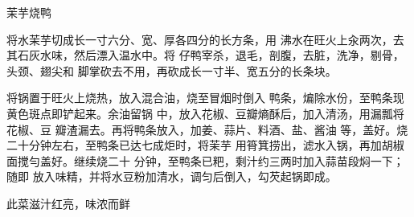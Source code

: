 \begin{recipe}{茉芋烧鸭}

\ingredients




\cooking

\step 将水茉芋切成长一寸六分、宽、厚各四分的长方条，用 沸水在旺火上汆两次，去其石灰水味，然后漂入温水中。将 仔鸭宰杀，退毛，剖腹，去脏，洗净，剔骨，头颈、翅尖和 脚掌砍去不用，再砍成长一寸半、宽五分的长条块。

\step 将锅置于旺火上烧热，放入混合油，烧至冒烟时倒入 鸭条，煸除水份，至鸭条现黄色斑点即铲起来。余油留锅 中，放入花椒、豆瓣熵酥后，加入清汤，用漏瓢将花椒、豆 瓣渣漏去。再将鸭条放入，加姜、蒜片、料酒、盐、酱油 等，盖好。烧二十分钟左右，至鸭条已达七成炬时，将茉芋 用筲箕捞出，滤水入锅，再加胡椒面搅勻盖好。继续烧二十 分钟，至鸭条已粑，剩汁约三两时加入蒜苗段焖一下；随即 放入味精，并将水豆粉加清水，调匀后倒入，勾芡起锅即成。

\notes

此菜滋汁红亮，味浓而鲜

\end{recipe}


